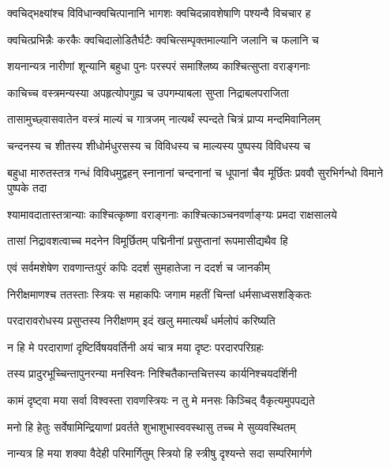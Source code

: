 \twolineshloka
{क्वचिद्भक्ष्यांश्च विविधान्क्वचित्पानानि भागशः}
{क्वचिदन्नावशेषाणि पश्यन्वै विचचार ह} %

\twolineshloka
{क्वचित्प्रभिन्नैः करकैः क्वचिदालोडितैर्घटैः}
{क्वचित्सम्पृक्तमाल्यानि जलानि च फलानि च} %

\twolineshloka
{शयनान्यत्र नारीणां शून्यानि बहुधा पुनः}
{परस्परं समाश्लिष्य काश्चित्सुप्ता वराङ्गनाः} %

\twolineshloka
{काचिच्च वस्त्रमन्यस्या अपहृत्योपगुह्य च}
{उपगम्याबला सुप्ता निद्राबलपराजिता} %

\twolineshloka
{तासामुच्छ्वासवातेन वस्त्रं माल्यं च गात्रजम्}
{नात्यर्थं स्पन्दते चित्रं प्राप्य मन्दमिवानिलम्} %

\twolineshloka
{चन्दनस्य च शीतस्य शीधोर्मधुरसस्य च}
{विविधस्य च माल्यस्य पुष्पस्य विविधस्य च} %

\threelineshloka
{बहुधा मारुतस्तत्र गन्धं विविधमुद्वहन्}
{स्नानानां चन्दनानां च धूपानां चैव मूर्छितः}
{प्रववौ सुरभिर्गन्धो विमाने पुष्पके तदा} %

\twolineshloka
{श्यामावदातास्तत्रान्याः काश्चित्कृष्णा वराङ्गनाः}
{काश्चित्काञ्चनवर्णाङ्ग्यः प्रमदा राक्षसालये} %

\twolineshloka
{तासां निद्रावशत्वाच्च मदनेन विमूर्छितम्}
{पद्मिनीनां प्रसुप्तानां रूपमासीद्यथैव हि} %

\twolineshloka
{एवं सर्वमशेषेण रावणान्तःपुरं कपिः}
{ददर्श सुमहातेजा न ददर्श च जानकीम्} %

\twolineshloka
{निरीक्षमाणश्च ततस्ताः स्त्रियः स महाकपिः}
{जगाम महतीं चिन्तां धर्मसाध्वसशङ्कितः} %

\twolineshloka
{परदारावरोधस्य प्रसुप्तस्य निरीक्षणम्}
{इदं खलु ममात्यर्थं धर्मलोपं करिष्यति} %

\twolineshloka
{न हि मे परदाराणां दृष्टिर्विषयवर्तिनी}
{अयं चात्र मया दृष्टः परदारपरिग्रहः} %

\twolineshloka
{तस्य प्रादुरभूच्चिन्तापुनरन्या मनस्विनः}
{निश्चितैकान्तचित्तस्य कार्यनिश्चयदर्शिनी} %

\twolineshloka
{कामं दृष्ट्वा मया सर्वा विश्वस्ता रावणस्त्रियः}
{न तु मे मनसः किञ्चिद् वैकृत्यमुपपद्यते} %

\twolineshloka
{मनो हि हेतुः सर्वेषामिन्द्रियाणां प्रवर्तते}
{शुभाशुभास्ववस्थासु तच्च मे सुव्यवस्थितम्} %

\twolineshloka
{नान्यत्र हि मया शक्या वैदेही परिमार्गितुम्}
{स्त्रियो हि स्त्रीषु दृश्यन्ते सदा सम्परिमार्गणे} %

